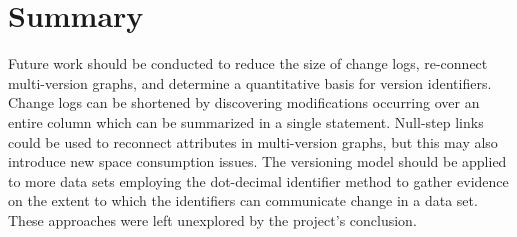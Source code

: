 \section{Summary}

Future work should be conducted to reduce the size of change logs, re-connect multi-version graphs, and determine a quantitative basis for version identifiers.
Change logs can be shortened by discovering modifications occurring over an entire column which can be summarized in a single statement.
Null-step links could be used to reconnect attributes in multi-version graphs, but this may also introduce new space consumption issues.
The versioning model should be applied to more data sets employing the dot-decimal identifier method to gather evidence on the extent to which the identifiers can communicate change in a data set.
These approaches were left unexplored by the project's conclusion.